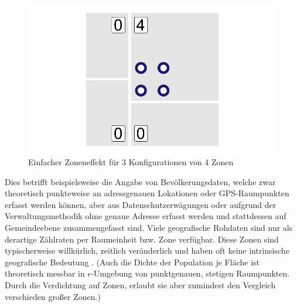 \begin{figure}[htb]
\begin{minipage}[b]{.32\linewidth}
    \end{minipage}
    \hfill
    \begin{minipage}[b]{.32\linewidth}
       \includegraphics[width=\linewidth,trim={0.5cm 0.5cm 0.5cm 0.5cm},clip]{body/figures/43-maup_3.pdf}
    \end{minipage}
    \caption[Zoneneffekt]{Einfacher Zoneneffekt für 3 Konfigurationen von 4 Zonen }
    \label{fig_zoning}
 \end{figure}

Dies betrifft beispielsweise die Angabe von Bevölkerungsdaten, welche zwar theoretisch punkteweise an adressgenauen Lokationen oder GPS-Raumpunkten erfasst werden können, 
aber aus Datenschutzerwägungen oder aufgrund der Verwaltungsmethodik ohne genaue Adresse erfasst werden und stattdessen auf Gemeindeebene zusammengefasst sind. 
Viele geografische Rohdaten sind nur als derartige Zählraten per Raumeinheit bzw. Zone verfügbar. 
Diese Zonen sind typischerweise willkürlich, zeitlich veränderlich und haben oft keine intrinsische geografische Bedeutung \cite[S. 213]{fischer_handbook_2010}.
(Auch die Dichte der Population je Fläche ist theoretisch messbar in $\epsilon$-Umgebung von punktgenauen, stetigen Raumpunkten. 
Durch die Verdichtung auf Zonen, erlaubt sie aber zumindest den Vergleich verschieden großer Zonen.) \\



